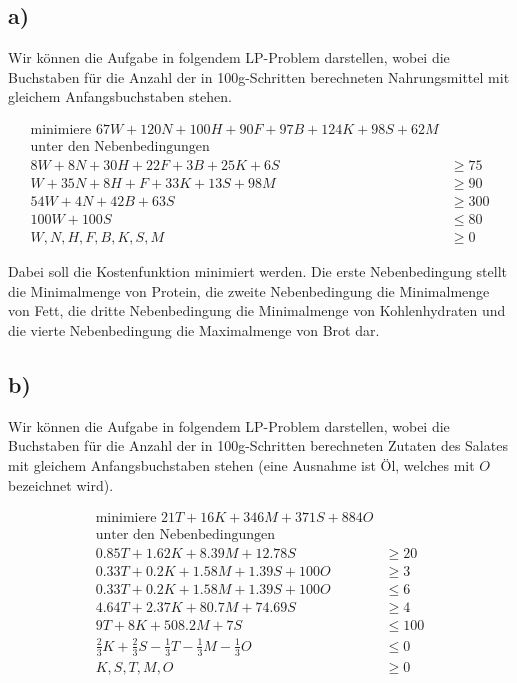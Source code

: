 \documentclass{article}
\begin{document}
\subsection*{a)}
Wir können die Aufgabe in folgendem LP-Problem darstellen, wobei die Buchstaben für die Anzahl der in 100g-Schritten berechneten Nahrungsmittel mit gleichem Anfangsbuchstaben stehen.

\begin{align*}
	\text{minimiere } 67W + 120N + 100H + 90F + 97B + 124K + 98S + 62M\\
	\text{unter den Nebenbedingungen}\\
	8W + 8N + 30H + 22F + 3B + 25K + 6S &\geq 75\\
	W + 35N + 8H + F + 33K + 13S + 98M &\geq 90\\
	54W + 4N + 42B + 63S &\geq 300\\
	100W + 100S &\leq 80\\
	W, N, H, F, B, K, S, M &\geq 0
\end{align*}

Dabei soll die Kostenfunktion minimiert werden. Die erste Nebenbedingung stellt die Minimalmenge von Protein, die zweite Nebenbedingung die Minimalmenge von Fett, die dritte Nebenbedingung die Minimalmenge von Kohlenhydraten und die vierte Nebenbedingung die Maximalmenge von Brot dar.


\subsection*{b)}
Wir können die Aufgabe in folgendem LP-Problem darstellen, wobei die Buchstaben für die Anzahl der in 100g-Schritten berechneten Zutaten des Salates mit gleichem Anfangsbuchstaben stehen (eine Ausnahme ist Öl, welches mit $O$ bezeichnet wird).

\begin{align*}
	\text{minimiere } 21T + 16K + 346M + 371S + 884O\\
	\text{unter den Nebenbedingungen}\\
	0.85T + 1.62K + 8.39M + 12.78S &\geq 20\\
	0.33T + 0.2K + 1.58M + 1.39S + 100O &\geq 3\\
	0.33T + 0.2K + 1.58M + 1.39S + 100O &\leq 6\\
	4.64T + 2.37K + 80.7M + 74.69S &\geq 4\\
	9T + 8K + 508.2M + 7S &\leq 100\\
	\frac{2}{3}K + \frac{2}{3}S - \frac{1}{3}T - \frac{1}{3}M - \frac{1}{3}O &\leq 0\\
	K, S, T, M, O &\geq 0
\end{align*}
\end{document}
